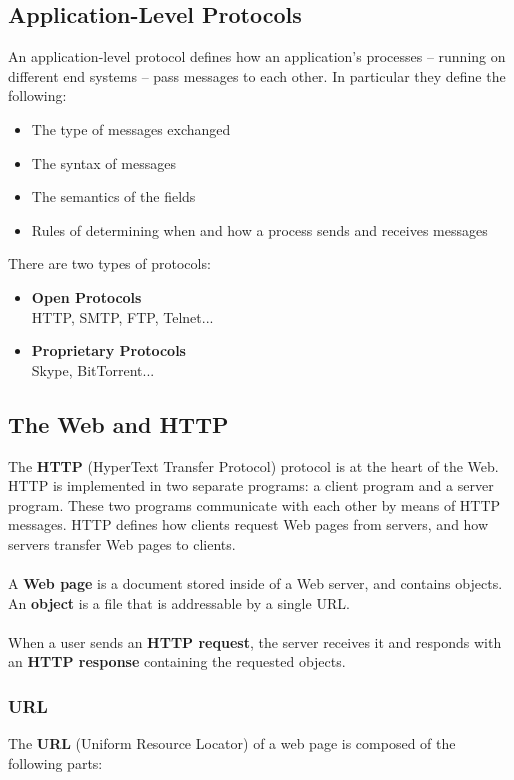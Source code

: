 \documentclass{article}
\begin{document}
\subsection{Application-Level Protocols}
An application-level protocol defines how an application's processes -- running on different end systems -- pass messages to each other. In particular they define the following:

\begin{itemize}
	\item The type of messages exchanged 
	\item The syntax of messages
	\item The semantics of the fields
	\item Rules of determining when and how a process sends and receives messages
\end{itemize}
There are two types of protocols:
\begin{itemize}
	\item \textbf{Open Protocols}
	\vspace{.2cm} \\
	HTTP, SMTP, FTP, Telnet...
	
	\item \textbf{Proprietary Protocols}
	\vspace{.2cm} \\
	Skype, BitTorrent...
\end{itemize}

\subsection{The Web and HTTP}
The \textbf{HTTP} (HyperText Transfer Protocol) protocol is at the heart of the Web. HTTP is implemented in two separate programs: a client program and a server program. These two programs communicate with each other by means of HTTP messages. HTTP defines how clients request Web pages from servers, and how servers transfer Web pages to clients. \\ \\
A \textbf{Web page} is a document stored inside of a Web server, and contains objects. An \textbf{object} is a file that is addressable by a single URL. \\ \\
When a user sends an \textbf{HTTP request}, the server receives it and responds with an \textbf{HTTP response} containing the requested objects.

\subsubsection{URL}
The \textbf{URL} (Uniform Resource Locator) of a web page is composed of the following parts: \\
\end{document}
